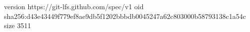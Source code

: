 version https://git-lfs.github.com/spec/v1
oid sha256:d43e43449f779ef8ae9db5f1202bbbdb0045247a62c803000b58793138c1a54c
size 3511
